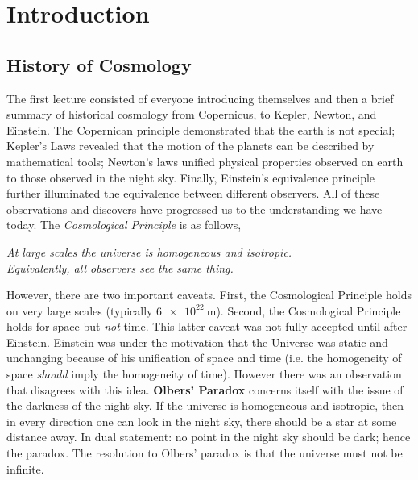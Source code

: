 \documentclass{article}
\begin{document}
\titlePage

\tableOfContents

\disclaimer

\section{Introduction}


\subsection{History of Cosmology}

The first lecture consisted of everyone introducing themselves and then a brief summary of historical cosmology from Copernicus, to Kepler, Newton, and Einstein. The Copernican principle demonstrated that the earth is not special; Kepler's Laws revealed that the motion of the planets can be described by mathematical tools; Newton's laws unified physical properties observed on earth to those observed in the night sky. Finally, Einstein's equivalence principle further illuminated the equivalence between different observers. All of these observations and discovers have progressed us to the understanding we have today. The \textit{Cosmological Principle} is as follows,

\begin{center}
    \textit{At large scales the universe is homogeneous and isotropic.}\\
    \textit{Equivalently, all observers see the same thing.}
\end{center}

However, there are two important caveats. First, the Cosmological Principle holds on very large scales (typically $\SI{6e22}{\m}$). Second, the Cosmological Principle holds for space but \textit{not} time. This latter caveat was not fully accepted until after Einstein. Einstein was under the motivation that the Universe was static and unchanging because of his unification of space and time (i.e. the homogeneity of space \textit{should} imply the homogeneity of time). However there was an observation that disagrees with this idea. \textbf{Olbers' Paradox} concerns itself with the issue of the darkness of the night sky. If the universe is homogeneous and isotropic, then in every direction one can look in the night sky, there should be a star at some distance away. In dual statement: no point in the night sky should be dark; hence the paradox. The resolution to Olbers' paradox is that the universe must not be infinite. \\
\end{document}
